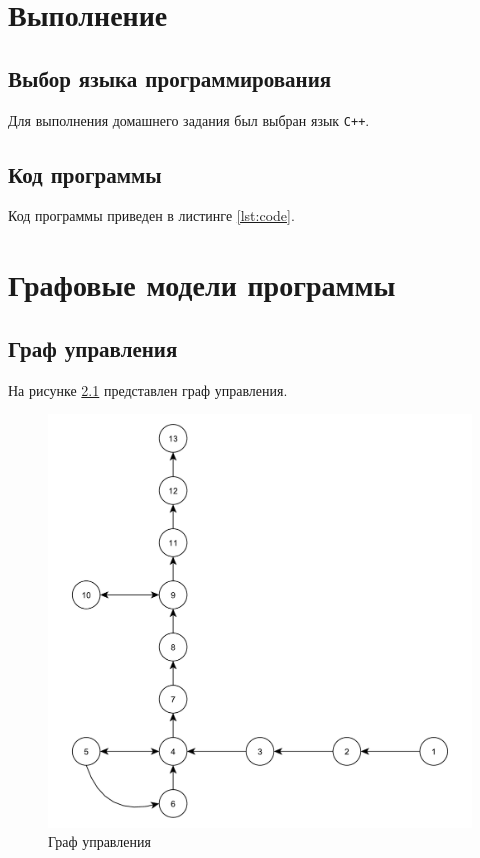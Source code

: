 \chapter{Выполнение}

\section{Выбор языка программирования}
Для выполнения домашнего задания был выбран язык \texttt{C++}.

\section{Код программы}

Код программы приведен в листинге \ref{lst:code}.



\chapter{Графовые модели программы}

\section{Граф управления}

На рисунке \ref{fg:mg} представлен граф управления.

\begin{figure}[h]
	\centering
	\includegraphics[height=0.6\textheight]{images/ГУ.pdf}
	\caption{Граф управления}
	\label{fg:mg}
\end{figure}

